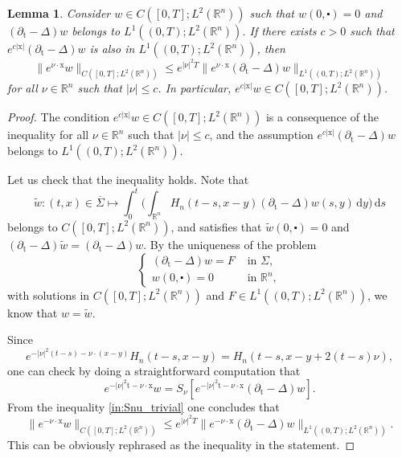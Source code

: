 \documentclass[10pt,a4paper]{amsart}
\newtheorem{lemma}[proposition]{Lemma}
\theoremstyle{remark}
\theoremstyle{definition}
\newcommand{\R}{\mathbb{R}}
\newcommand{\dd}{\mathrm{d}}
\newcommand{\tm}{\mathrm{t}}
\newcommand{\x}{\mathrm{x}}
\begin{document}
\begin{lemma}\label{lem:propagation_of_decay}\sl Consider $w \in C([0, T] ; L^{2}(\mathbb{R}^{n}))$ such that $w(0, \centerdot)=0$ 
and $(\partial_{\tm}-\Delta)w $ belongs to $ L^{1}((0, T) ; L^{2}(\mathbb{R}^{n}))$.
If there exists $c > 0$ such that 
$e^{c|\x|} (\partial_{\tm}-\Delta)w $ is also in $L^{1}((0, T) ; L^{2}(\mathbb{R}^{n}))$, then
\[ \|e^{\nu \cdot \x} w\|_{C([0, T] ; L^{2}(\mathbb{R}^{n}))} \leq e^{|\nu|^2 T} \|e^{\nu \cdot \x} (\partial_{\tm}-\Delta)w\|_{L^{1}((0, T) ; L^{2}(\mathbb{R}^{n}))} \]
for all $\nu \in \R^n$ such that $|\nu| \leq c$. In particular, 
$e^{c|\x|} w \in C([0, T] ; L^{2}(\mathbb{R}^{n}))$.
\end{lemma}

\begin{proof}
The condition $e^{c|\x|} w \in C([0, T] ; L^{2}(\mathbb{R}^{n}))$ is a consequence of the inequality for all $\nu \in \R^n$ such that $|\nu| \leq c$, and the assumption
$e^{c|\x|} (\partial_{\tm}-\Delta)w $ belongs to $ L^{1}((0, T) ; L^{2}(\mathbb{R}^{n}))$.

Let us check that the inequality holds.
Note that
\[ \tilde{w}: (t, x) \in \overline{\Sigma} \longmapsto \int_0^t \Big( \int_{\R^n} H_n (t-s, x-y) (\partial_{\tm}-\Delta)w(s, y) \, \dd y \Big) \, \dd s \]
belongs to $C([0, T] ; L^{2}(\mathbb{R}^{n}))$, and satisfies that $\tilde w(0, \centerdot)=0$ 
and $(\partial_{\tm}-\Delta)\tilde w = (\partial_{\tm}-\Delta)w $. By the uniqueness of the problem
$$
\begin{cases} (\partial_{\tm}-\Delta)w=F & \text { in } \Sigma, \\ w(0, \centerdot)=0 & \text { in } \mathbb{R}^{n},\end{cases}
$$
with solutions in $C([0, T] ; L^{2}(\mathbb{R}^{n}))$ and 
$F \in L^{1}((0, T) ; L^{2}(\mathbb{R}^{n}))$, we know that $w = \tilde w$.

Since 
\[e^{-|\nu|^2(t-s) - \nu \cdot (x-y)} H_n (t-s, x-y) = H_n (t-s, x-y + 2(t - s)\nu), \]
one can check by doing a straightforward computation that
\[e^{-|\nu|^2\tm - \nu \cdot \x} w = S_\nu [e^{-|\nu|^2\tm - \nu \cdot \x} (\partial_{\tm}-\Delta)w].\]
From the inequality \eqref{in:Snu_trivial} one concludes that
\[ \|e^{-\nu \cdot \x} w\|_{C([0, T] ; L^{2}(\mathbb{R}^{n}))} \leq e^{|\nu|^2 T} \|e^{-\nu \cdot \x} (\partial_{\tm}-\Delta)w\|_{L^{1}((0, T) ; L^{2}(\mathbb{R}^{n}))}. \]
This can be obviously rephrased as the inequality in the statement.
\end{proof}
\end{document}
